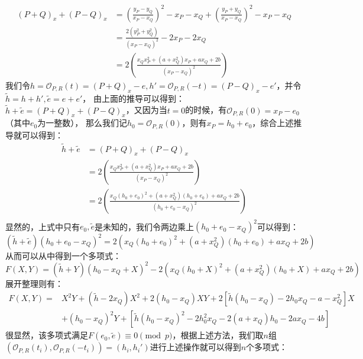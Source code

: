 \documentclass{book}
\numberwithin{equation}{subsubsection}
\begin{document}
\begin{equation}
    \begin{aligned}
        (P+Q)_x+(P-Q)_x&=\left(\frac{y_P-y_Q}{x_P-x_Q}\right)^2-x_P-x_Q+\left(\frac{y_P+y_Q}{x_P-x_Q}\right)^2-x_P-x_Q\\
        &=\frac{2(y_P^2+y_Q^2)}{(x_P-x_Q)^2}-2x_P-2x_Q\\
        &=2\left(\frac{x_Qx_P^2+(a+x_Q^2)x_P+ax_Q+2b}{(x_P-x_Q)^2}\right)
    \end{aligned}
    \nonumber
\end{equation}
我们令$h=\mathcal{O}_{P,R}(t)=(P+Q)_x-e,h'=\mathcal{O}_{P,R}(-t)=(P-Q)_x-e'$，并令$\widetilde{h}=h+h',\widetilde{e}=e+e'$，
由上面的推导可以得到：$\widetilde{h}+\widetilde{e}=(P+Q)_x+(P-Q)_x$，又因为当$t=0$的时候，有$\mathcal{O}_{P,R}(0)=x_P-e_0$（其中$e_0$为一整数），
那么我们记$h_0=\mathcal{O}_{P,R}(0)$，则有$x_P=h_0+e_0$，综合上述推导就可以得到：
\begin{equation}
    \begin{aligned}
        \widetilde{h}+\widetilde{e}&=(P+Q)_x+(P-Q)_x\\
        &=2\left(\frac{x_Qx_P^2+(a+x_Q^2)x_P+ax_Q+2b}{(x_P-x_Q)^2}\right)\\
        &=2\left(\frac{x_Q(h_0+e_0)^2+(a+x_Q^2)(h_0+e_0)+ax_Q+2b}{(h_0+e_0-x_Q)^2}\right)\\
    \end{aligned}
    \nonumber
\end{equation}
显然的，上式中只有$e_0,\widetilde{e}$是未知的，我们令两边乘上$(h_0+e_0-x_Q)^2$可以得到：
\begin{equation}
    (\widetilde{h}+\widetilde{e})(h_0+e_0-x_Q)^2=2(x_Q(h_0+e_0)^2+(a+x_Q^2)(h_0+e_0)+ax_Q+2b)
    \nonumber
\end{equation}
从而可以从中得到一个多项式：
\begin{equation}
    F(X,Y)=(\widetilde{h}+Y)(h_0-x_Q+X)^2-2(x_Q(h_0+X)^2+(a+x_Q^2)(h_0+X)+ax_Q+2b)
    \nonumber
\end{equation}
展开整理则有：
\begin{equation}
    \begin{aligned}
        F(X,Y)=&X^2Y+(\widetilde{h}-2x_Q)X^2+2(h_0-x_Q)XY+2[\widetilde{h}(h_0-x_Q)-2h_0x_Q-a-x_Q^2]X\\
        &+(h_0-x_Q)^2Y+[\widetilde{h}(h_0-x_Q)^2-2h_0^2x_Q-2(a+x_Q)h_0-2ax_Q-4b]
    \end{aligned}
    \nonumber
\end{equation}
很显然，该多项式满足$F(e_0,\widetilde{e})\equiv0\pmod{p}$，根据上述方法，我们取$n$组$(\mathcal{O}_{P,R}(t_i),\mathcal{O}_{P,R}(-t_i))=(h_i,h_i')$进行上述操作就可以得到$n$个多项式：
\end{document}
